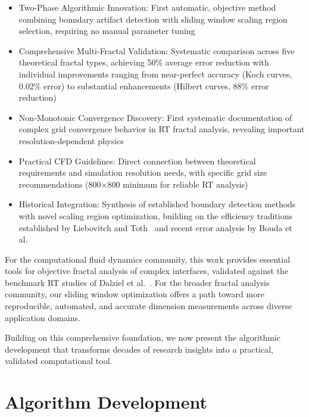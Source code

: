 \documentclass[preprint,12pt]{elsarticle}
\def\textbf#1{#1}%
\begin{document}
\begin{itemize}
\item \textbf{Two-Phase Algorithmic Innovation}: First automatic, objective method combining boundary artifact detection with sliding window scaling region selection, requiring no manual parameter tuning

\item \textbf{Comprehensive Multi-Fractal Validation}: Systematic comparison across five theoretical fractal types, achieving 50\% average error reduction with individual improvements ranging from near-perfect accuracy (Koch curves, 0.02\% error) to substantial enhancements (Hilbert curves, 88\% error reduction)

\item \textbf{Non-Monotonic Convergence Discovery}: First systematic documentation of complex grid convergence behavior in RT fractal analysis, revealing important resolution-dependent physics

\item \textbf{Practical CFD Guidelines}: Direct connection between theoretical requirements and simulation resolution needs, with specific grid size recommendations (800×800 minimum for reliable RT analysis)

\item \textbf{Historical Integration}: Synthesis of established boundary detection methods with novel scaling region optimization, building on the efficiency traditions established by Liebovitch and Toth~\cite{liebovitch1989} and recent error analysis by Bouda et al.~\cite{bouda2016}
\end{itemize}

For the computational fluid dynamics community, this work provides essential tools for objective fractal analysis of complex interfaces, validated against the benchmark RT studies of Dalziel et al.~\cite{dalziel1999}. For the broader fractal analysis community, our sliding window optimization offers a path toward more reproducible, automated, and accurate dimension measurements across diverse application domains.

Building on this comprehensive foundation, we now present the algorithmic development that transforms decades of research insights into a practical, validated computational tool.


\section{Algorithm Development}
\label{sec:algorithm}
\end{document}
